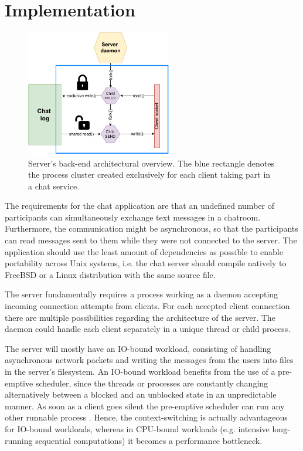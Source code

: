 \section{Implementation}
\begin{figure}[!t]
	\centering
	\includegraphics[width=2.5in]{img/server.pdf}
	\caption{Server's back-end architectural overview. The blue rectangle denotes the process cluster created exclusively for each client taking part in a chat service.}
	\label{fig_server_backend}
\end{figure}
The requirements for the chat application are that an undefined number of participants can simultaneously exchange text messages in a chatroom. Furthermore, the communication might be asynchronous, so that the participants can read messages sent to them while they were not connected to the server. The application should use the least amount of dependencies as possible to enable portability across Unix systems, i.e. the chat server should compile natively to FreeBSD or a Linux distribution with the same source file.

The server fundamentally requires a process working as a daemon accepting incoming connection attempts from clients. For each accepted client connection there are multiple possibilities regarding the architecture of the server. The daemon could handle each client separately in a unique thread or child process.

The server will mostly have an IO-bound workload, consisting of handling asynchronous network packets and writing the messages from the users into files in the server's filesystem. An IO-bound workload benefits from the use of a pre-emptive scheduler, since the threads or processes are constantly changing alternatively between a blocked and an unblocked state in an unpredictable manner. As soon as a client goes silent the pre-emptive scheduler can run any other runnable process \cite{Kennedy2018}. Hence, the context-switching is actually advantageous for IO-bound workloads, whereas in CPU-bound workloads (e.g. intensive long-running sequential computations) it becomes a performance bottleneck.

